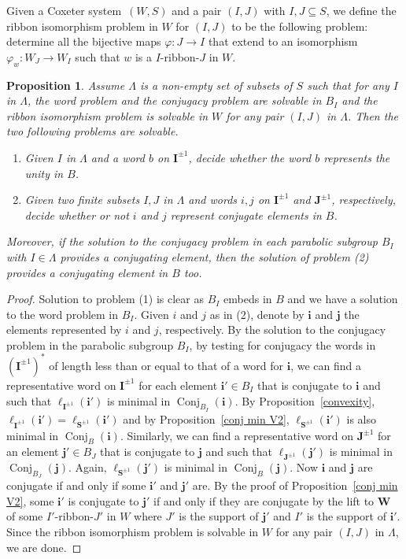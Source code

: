\documentclass{amsart}
\numberwithin{equation}{section}
\newtheorem{proposition}[equation]{Proposition}
\newcommand\lS{{\ell_{\bS^{\pm1}}}}
\newcommand\bi{{\mathbf i}}
\newcommand\bj{{\mathbf j}}
\newcommand\bI{{\mathbf I}}
\newcommand\bJ{{\mathbf J}}
\newcommand\bS{{\mathbf S}}
\newcommand\bW{{\mathbf W}}
\DeclareMathOperator\conj{Conj}
\begin{document}
Given  a Coxeter system~$(W,S)$ and a  pair $(I,J)$ with $I,J \subseteq S$,
we define the ribbon isomorphism problem in $W$ for $(I,J)$ to be the
following problem: determine all the bijective maps $\varphi : J\to I$ that
extend to an isomorphism $\varphi_w : W_J \to W_I$ such that $w$ is a
$I$-ribbon-$J$ in $W$.

\begin{proposition}\label{conjugaison V2} 
Assume $\Lambda$ is a non-empty set of subsets of $S$ such that for any $I$ in
$\Lambda$,  the word problem and the  conjugacy problem are solvable in $B_I$ and the ribbon isomorphism problem is solvable in $W$ for any pair $(I,J)$ in $\Lambda$.
Then the two following problems are solvable.
\begin{enumerate}
\item Given $I$ in $\Lambda$ and a word $b$ on $\bI^{\pm 1}$, decide whether the
word $b$ represents the unity in $B$.
\item  Given two finite subsets $I, J$ in $\Lambda$ and words $i, j$ on $\bI^{\pm 1}$
and $\bJ^{\pm 1}$, respectively, decide whether or not $i$ and $j$ represent
conjugate elements in $B$.
\end{enumerate}
Moreover,  if the solution to the conjugacy problem in each parabolic subgroup
$B_I$ with $I\in \Lambda$ provides a conjugating element, then the solution of
problem (2) provides a conjugating element in $B$ too.
\end{proposition}
\begin{proof}
Solution to problem (1) is clear as $B_I$ embeds in $B$ and we have a
solution to the word problem in $B_I$. Given $i$ and $j$ as in (2),
denote  by $\bi$  and $\bj$  the elements  represented by $i$ and $j$,
respectively. By the solution to the conjugacy problem in the parabolic subgroup
$B_I$, by testing for conjugacy the words in $(\bI^{\pm 1})^*$ of length less than or
equal to that of a word for $\bi$, we can find a representative word on
$\bI^{\pm 1}$ for each element $\bi'\in B_I$ that is conjugate to $\bi$ and
such that $\ell_{\bI^{\pm1}}(\bi')$ is minimal in $\conj_{B_I}(\bi)$.
By Proposition~\ref{convexity},
$\ell_{\bI^{\pm1}}(\bi')  = \lS(\bi')$ and  by Proposition~\ref{conj min
 V2},  $\lS(\bi')$ is also minimal in $\conj_B(\bi)$.
Similarly, we can find a representative word on $\bJ^{\pm 1}$ for an
element $\bj'\in B_J$ that is conjugate to $\bj$ and such that
$\ell_{\bJ^{\pm1}}(\bj')$ is minimal in $\conj_{B_J}(\bj)$.
Again, $\lS(\bj')$  is minimal  in $\conj_B(\bj)$. 
Now $\bi$ and $\bj$ are conjugate if and only if some $\bi'$
and $\bj'$ are. By  the proof of  Proposition~\ref{conj min V2}, some
$\bi'$ is conjugate to $\bj'$ if and only if they are conjugate 
by the lift to $\bW$ of some $I'$-ribbon-$J'$ in $W$ where $J'$ is the support of
$\bj'$ and $I'$ is the support of $\bi'$.  Since the ribbon isomorphism problem is solvable in $W$ for any pair $(I,J)$ in $\Lambda$, we are done.
\end{proof}
\end{document}
